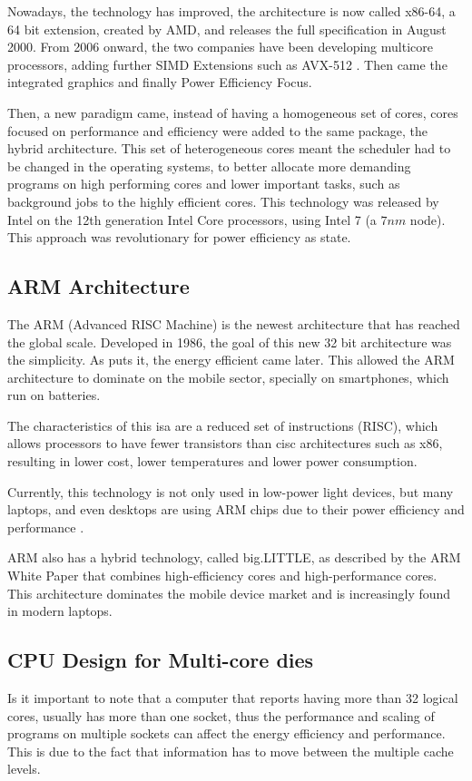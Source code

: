 Nowadays, the technology has improved, the architecture is now called x86-64, a 64 bit extension, created by AMD, and releases the full specification in August 2000. From 2006 onward, the two companies have been developing multicore processors, adding further \gls{SIMD} Extensions such as AVX-512 \cite{intel-avx512}. Then came the integrated graphics and finally Power Efficiency Focus. 

Then, a new paradigm came, instead of having a homogeneous set of cores, cores focused on performance and efficiency were added to the same package, the hybrid architecture. This set of heterogeneous cores meant the scheduler had to be changed in the operating systems, to better allocate more demanding programs on high performing cores and lower important tasks, such as background jobs to the highly efficient cores. This technology was released by Intel on the 12th generation Intel Core processors, using Intel 7 (a $7 nm$ node). This approach was revolutionary for power efficiency as \textcite{big-little} state.


\subsection{ARM Architecture}
The ARM (Advanced RISC Machine) is the newest architecture that has reached the global scale. Developed in 1986, the goal of this new 32 bit architecture was the simplicity. As \textcite{arm:story} puts it, the energy efficient came later. This allowed the ARM architecture to dominate on the mobile sector, specially on smartphones, which run on batteries.

The characteristics of this \gls{isa} are a reduced set of instructions (\gls{RISC}), which  allows processors to have fewer transistors than \gls{cisc} architectures such as x86, resulting in lower cost, lower temperatures and lower power consumption.

Currently, this technology is not only used in low-power light devices, but many laptops, and even desktops are using ARM chips due to their power efficiency and performance \cite{arm:optimization-big.LITTLE}.

ARM also has a hybrid technology, called big.LITTLE, as described by the \cite{arm:biglittle2013}{ ARM White Paper} that combines high-efficiency cores and high-performance cores. This architecture dominates the mobile device market and is increasingly found in modern laptops. 




\subsection{CPU Design for Multi-core dies}
Is it important to note that a computer that reports having more than 32 logical cores, usually has more than one socket, thus the performance and scaling of programs on multiple sockets can affect the energy efficiency and performance. This is due to the fact that information has to move between the multiple cache levels. 

